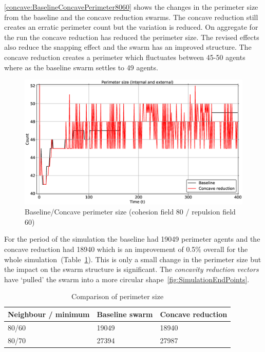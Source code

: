 \autoref{concave:BaselineConcavePerimeter8060} shows the changes in the perimeter size from the baseline and the concave reduction swarms. The concave reduction still creates an erratic perimeter count but the variation is reduced. On aggregate for the run the concave reduction has reduced the perimeter size. The revised effects also reduce the snapping effect and the swarm has an improved structure. The concave reduction creates a perimeter which fluctuates between 45-50 agents where as the baseline swarm settles to 49 agents.
 
\begin{figure}[H]
\begin{center}
\includegraphics[width=14cm]{CHAPTER-7/figures/BaselineConcavePerimeter8060}
\end{center}
\caption{Baseline/Concave perimeter size (cohesion field 80 / repulsion field 60)\label{concave:BaselineConcavePerimeter8060}}
\end{figure}

For the period of the simulation the baseline had 19049 perimeter agents and the concave reduction had 18940 which is an improvement of 0.5\% overall for the whole simulation~(Table~\ref{tab:BaselineConcaveComparison}). This is only a small change in the perimeter size but the impact on the swarm structure is significant. The \textit{concavity reduction vectors} have `pulled' the swarm into a more circular shape~\autoref{fig:SimulationEndPoints}.

\begin{table}[H]
\begin{center}
\begin{tabular}{| p{2.3cm} | p{2cm} | p{2cm} |}
\hline
\bf Neighbour / minimum & \bf Baseline \bf swarm & \bf Concave \bf reduction \\ \hline
80/60 & 19049 & 18940 \\  \hline
80/70 & 27394 & 27987 \\  \hline
\end{tabular}\caption{Comparison of perimeter size} \label{tab:BaselineConcaveComparison}
\end{center}
\end{table}

